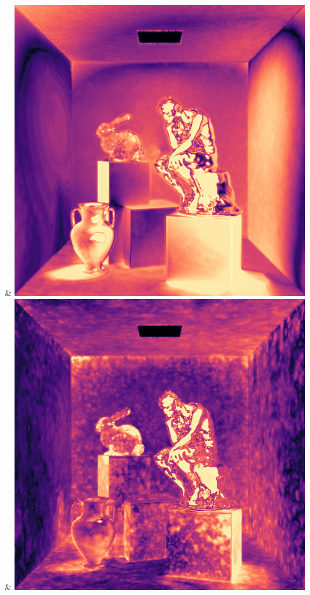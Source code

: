 & \includegraphics[width=\linewidth]{figures/py/tests/batch_size/5+nrc+pt+16@4_1spp_flip.png}
& \includegraphics[width=\linewidth]{figures/py/tests/batch_size/25+nrc+pt+16@4_1spp_flip.png}
